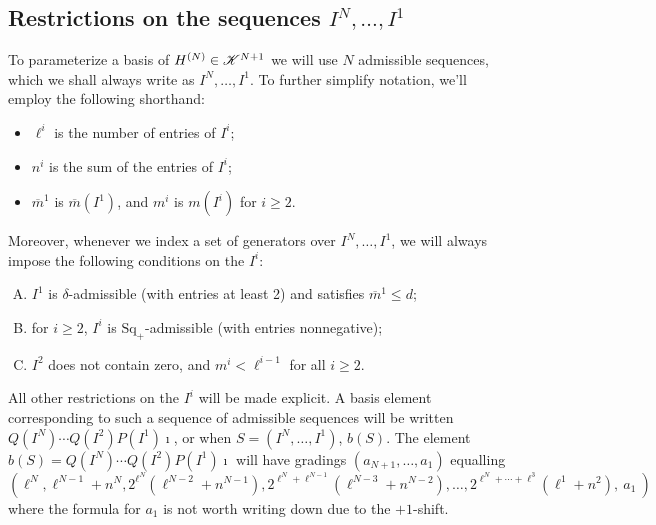 \documentclass[11pt]{article}
\newcommand{\LL}[1]{{\scrK}^{#1}}%
\renewcommand{\Q}{Q}
\newcommand{\SqShift}{\Sq_{+}}
\newcommand{\Sq}{\mathrm{Sq}}
\newcommand{\minDim}{m}
\newcommand{\minDimP}{\overline{m}}
\begin{document}
\begin{CalculatingRepeatedKoszul}
\subsection{Restrictions on the sequences $I^N,\ldots,I^1$}
To parameterize a basis of $H^{(N)}\in\LL{N+1}$ we will use $N$ admissible sequences, which we shall always write as $I^N,\ldots,I^1$. To further simplify notation, we'll employ the following shorthand:
\begin{itemize}
\squishlist
\setlength{\parindent}{.25in}
\item $\ell^i$ is the number of entries of $I^i$;
\item $n^i$ is the sum of the entries of $I^i$;
\item $\minDimP^1$ is $\minDimP(I^1)$, and $\minDim^i$ is $\minDim(I^i)$ for $i\geq2$.
\end{itemize}
Moreover, whenever we index a set of generators over $I^N,\ldots,I^1$, we will always impose the following conditions on the $I^i$:
\begin{enumerate}[A)]
\squishlist
\setlength{\parindent}{.25in}
\item $I^1$ is $\delta$-admissible (with entries at least 2) and satisfies $\minDimP^1\leq d$;
\item for $i\geq2$, $I^i$ is $\SqShift$-admissible (with entries nonnegative);
\item $I^2$ does not contain zero, and $\minDim^i<\ell^{i-1}$ for all $i\geq2$.
\end{enumerate}
All other restrictions on the $I^i$ will be made explicit. A basis element corresponding to such a sequence of admissible sequences will be written $\Q(I^N)\cdots \Q(I^2)P(I^1)\imath$, or when $S=(I^N,\ldots,I^1)$, $b(S)$. The element $b(S)=\Q(I^N)\cdots \Q(I^2)P(I^1)\imath$ will have gradings $(a_{N+1},\ldots,a_1)$ equalling
\[\left(\ell^N,\ell^{N-1}+n^N,2^{\ell^N}\!\left(\ell^{N-2}+n^{N-1}\right),2^{\ell^N+\ell^{N-1}}\!\left(\ell^{N-3}+n^{N-2}\right),\ldots,2^{\ell^N+\cdots+\ell^{3}}(\ell^1+n^2),\ a_1\ \right)\]
where the formula for $a_1$ is not worth writing down due to the $+1$-shift.

\end{CalculatingRepeatedKoszul}
\end{document}

